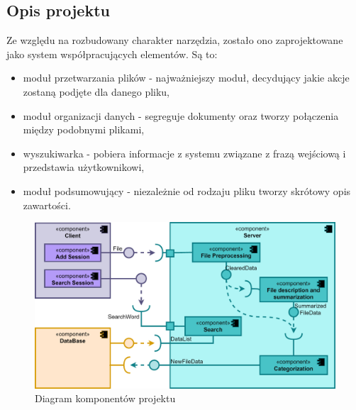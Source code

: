 \documentclass[12pt,a4paper,twoside]{article}
\begin{document}
\subsection{Opis projektu}
Ze względu na rozbudowany charakter narzędzia, zostało ono zaprojektowane jako system współpracujących elementów. Są to:
\begin{itemize}
	\item moduł przetwarzania plików - najważniejszy moduł, decydujący jakie akcje zostaną podjęte dla danego pliku,
	\item moduł organizacji danych - segreguje dokumenty oraz tworzy połączenia między podobnymi plikami,
	\item wyszukiwarka - pobiera informacje z systemu związane z frazą wejściową i przedstawia użytkownikowi,
	\item moduł podsumowujący - niezależnie od rodzaju pliku tworzy skrótowy opis zawartości.
\end{itemize}\par
\begin{figure}[h!]
\centering
  \includegraphics[width=\textwidth]{img/component.pdf}
  \caption{Diagram komponentów projektu}
\end{figure}
\end{document}
